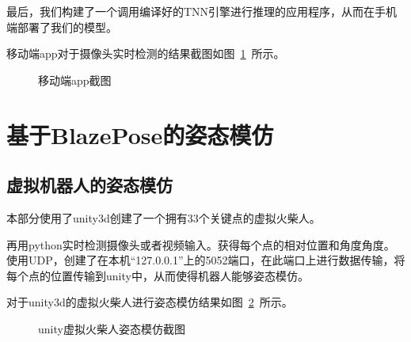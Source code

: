 最后，我们构建了一个调用编译好的TNN引擎进行推理的应用程序，从而在手机端部署了我们的模型。

移动端app对于摄像头实时检测的结果截图如图~\ref{picture:23}~所示。

\begin{figure}[!h]
\setlength{\subfigcapskip}{-1bp}
\centering
\begin{minipage}{\textwidth}
\centering
{}
\hspace{2em}
\hspace{2em}
\end{minipage}
\centering
\begin{minipage}{\textwidth}
\centering
{}
\hspace{2em}
\end{minipage}
\vspace{0.2em}
\caption{移动端app截图}
\label{picture:23}
\end{figure}

\section{基于BlazePose的姿态模仿}

\subsection{虚拟机器人的姿态模仿}

本部分使用了unity3d创建了一个拥有33个关键点的虚拟火柴人。

再用python实时检测摄像头或者视频输入。获得每个点的相对位置和角度角度。使用UDP，创建了在本机``127.0.0.1''上的5052端口，在此端口上进行数据传输，将每个点的位置传输到unity中，从而使得机器人能够姿态模仿。

对于unity3d的虚拟火柴人进行姿态模仿结果如图~\ref{picture:24}~所示。

\begin{figure}[!h]
\setlength{\subfigcapskip}{-1bp}
\centering
\begin{minipage}{\textwidth}
\centering
{}
\end{minipage}
\begin{minipage}{\textwidth}
\centering
{}
\end{minipage}
\vspace{0.2em}
\caption{unity虚拟火柴人姿态模仿截图}
\label{picture:24}
\end{figure}

